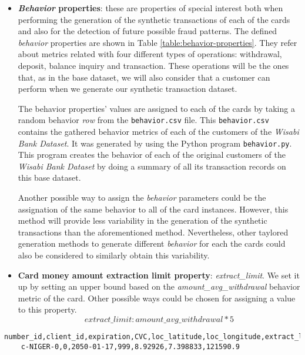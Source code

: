 \begin{itemize}
\item \textbf{\emph{Behavior} properties}: these are properties of special interest both when performing the 
generation of the synthetic transactions of each of the cards and also for the detection of future possible fraud patterns. The defined \emph{behavior} properties are shown in Table \ref{table:behavior-properties}. They refer about metrics related with four different types of operations: withdrawal, deposit, balance inquiry and transaction. These operations will be the ones that, as in the base dataset, we will also consider that a customer can perform when we generate our synthetic transaction dataset.



The behavior properties' values are assigned to each of the cards by taking a random behavior \emph{row} from the \texttt{behavior.csv} file. This \texttt{behavior.csv} contains the gathered behavior metrics of each of the customers of the \emph{Wisabi Bank Dataset}. It was generated by using the Python program \texttt{behavior.py}. This program creates the behavior of each of the original customers of the \emph{Wisabi Bank Dataset} by doing a summary of all its transaction records on this base dataset.

Another possible way to assign the \emph{behavior} parameters could be the assignation
of the same behavior to all of the card instances. However, this method will provide less variability in
the generation of the synthetic transactions than the aforementioned method. 
Nevertheless, other taylored generation methods to generate different \emph{behavior} for 
each the cards could also be considered to similarly obtain this
variability.

\item \textbf{Card money amount extraction limit property}: \emph{extract\_limit}. We set it up by setting an upper bound based on the \emph{amount\_avg\_withdrawal} behavior metric of the card. Other possible ways could be chosen for assigning a value to this property.
    $$extract\_limit: amount\_avg\_withdrawal * 5$$
\end{itemize}

\begin{center}
\lstset{style=csvStyle}
\begin{lstlisting}[caption={Example of card.csv (Part 1)}, label={csv:card}]
    number_id,client_id,expiration,CVC,loc_latitude,loc_longitude,extract_limit
    c-NIGER-0,0,2050-01-17,999,8.92926,7.398833,121590.9
\end{lstlisting}
\end{center}


